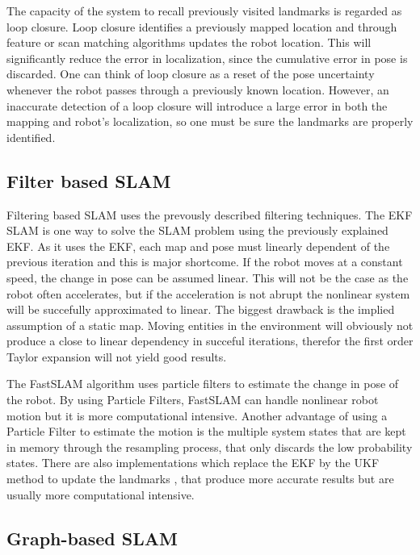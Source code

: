 The capacity of the system to recall previously visited landmarks is regarded as loop closure. Loop closure identifies a previously mapped location and through feature or scan matching algorithms updates the robot location. This will significantly reduce the error in localization, since the cumulative error in pose is discarded. One can think of loop closure as a reset of the pose uncertainty whenever the robot passes through a previously known location. However, an inaccurate detection of a loop closure will introduce a large error in both the mapping and robot's localization, so one must be sure the landmarks are properly identified.

\subsection{Filter based \acs*{SLAM}}

Filtering based \acs*{SLAM} uses the prevously described filtering techniques. The \acs*{EKF} \acs*{SLAM} is one way to solve the \acs*{SLAM} problem using the previously explained \acl*{EKF}. As it uses the \acs*{EKF}, each map and pose must linearly dependent of the previous iteration and this is major shortcome. If the robot moves at a constant speed, the change in pose can be assumed linear. This will not be the case as the robot often accelerates, but if the acceleration is not abrupt the nonlinear system will be succefully approximated to linear. The biggest drawback is the implied assumption of a static map. Moving entities in the environment will obviously not produce a close to linear dependency in succeful iterations, therefor the first order Taylor expansion will not yield good results. 


The FastSLAM algorithm \cite{thrun_fastslam_nodate} uses particle filters to estimate the change in pose of the robot. By using Particle Filters, FastSLAM can handle nonlinear robot motion but it is more computational intensive. Another advantage of using a Particle Filter to estimate the motion is the multiple system states that are kept in memory through the resampling process, that only discards the low probability states. There are also implementations which replace the \acs*{EKF} by the \acs*{UKF} method to update the landmarks \cite{wang_upf-ukf_2007}, that produce more accurate results but are usually more computational intensive.


\subsection{Graph-based \acs*{SLAM}}

